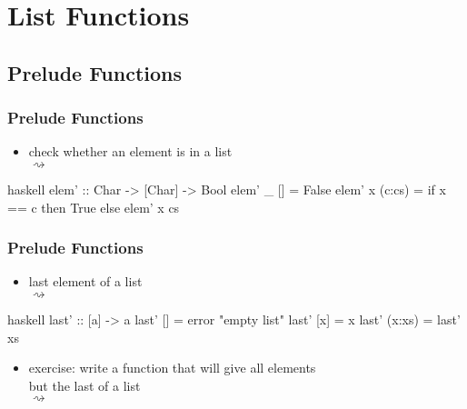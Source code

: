 \documentclass[dvipsnames]{beamer}
\theoremstyle{plain}
\begin{document}
\section{List Functions}

\subsection{Prelude Functions}

\begin{frame}[fragile]
  \frametitle{Prelude Functions}

  \begin{itemize}
    \item check whether an element is in a list\\
       $\rightsquigarrow$
  \end{itemize}

  \begin{exampleblock}{}
    \begin{pygments}{haskell}
elem' :: Char -> [Char] -> Bool
elem' _ [] = False
elem' x (c:cs) = if x == c then True else elem' x cs
    \end{pygments}
  \end{exampleblock}
\end{frame}

\begin{frame}[fragile]
  \frametitle{Prelude Functions}

  \begin{itemize}
    \item last element of a list\\
       $\rightsquigarrow$
  \end{itemize}

  \begin{exampleblock}{}
    \begin{pygments}{haskell}
last' :: [a] -> a
last' []     = error "empty list"
last' [x]    = x
last' (x:xs) = last' xs
    \end{pygments}
  \end{exampleblock}

  \pause
  \begin{itemize}
    \item exercise: write a function that will give all elements\\
      but the last of a list\\
       $\rightsquigarrow$
  \end{itemize}
\end{frame}
\end{document}
